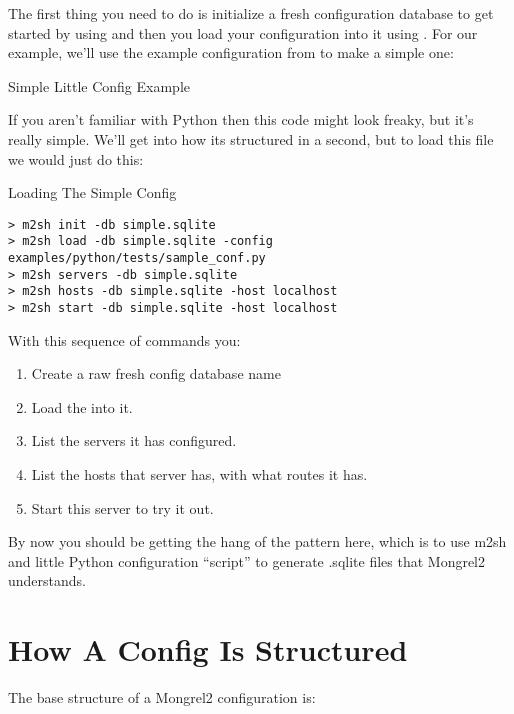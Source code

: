 The first thing you need to do is initialize a fresh configuration database to get
started by using  and then you load your configuration into it using
.  For our example, we'll use the example configuration
from  to make a simple one:

\begin{code}{Simple Little Config Example}
  
\end{code}

If you aren't familiar with Python then this code might look freaky, but it's really
simple.  We'll get into how its structured in a second, but to load this file
we would just do this:

\begin{code}{Loading The Simple Config}
\begin{lstlisting}
> m2sh init -db simple.sqlite
> m2sh load -db simple.sqlite -config examples/python/tests/sample_conf.py
> m2sh servers -db simple.sqlite
> m2sh hosts -db simple.sqlite -host localhost
> m2sh start -db simple.sqlite -host localhost
\end{lstlisting}
\end{code}

With this sequence of commands you:

\begin{enumerate}
\item Create a raw fresh config database name 
\item Load the  into it.
\item List the servers it has configured.
\item List the hosts that server has, with what routes it has.
\item Start this server to try it out.
\end{enumerate}

By now you should be getting the hang of the pattern here, which is to use
m2sh and little Python configuration ``script'' to generate .sqlite files
that Mongrel2 understands.

\section{How A Config Is Structured}

The base structure of a Mongrel2 configuration is:

